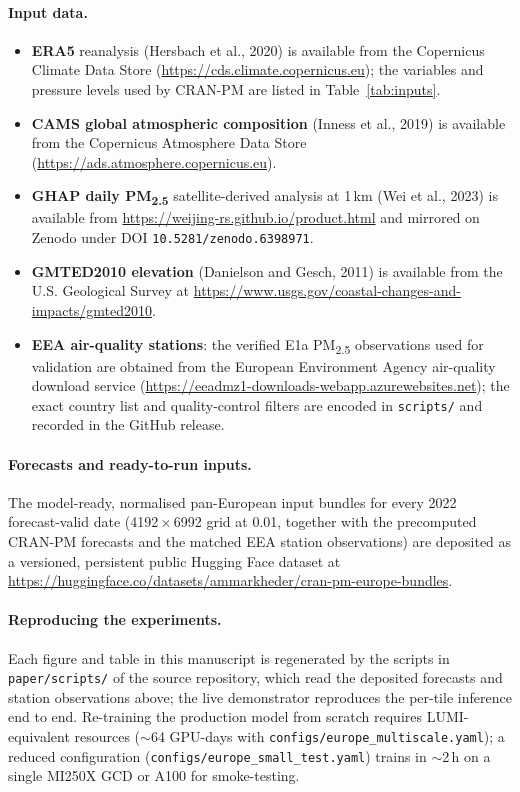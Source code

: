 \paragraph{Input data.}
\begin{itemize}
\item \textbf{ERA5} reanalysis (Hersbach et al., 2020) is available from
the Copernicus Climate Data Store
(\url{https://cds.climate.copernicus.eu}); the variables and pressure
levels used by CRAN-PM are listed in Table~\ref{tab:inputs}.

\item \textbf{CAMS global atmospheric composition} (Inness et al., 2019)
is available from the Copernicus Atmosphere Data Store
(\url{https://ads.atmosphere.copernicus.eu}).

\item \textbf{GHAP daily PM\textsubscript{2.5}} satellite-derived
analysis at 1\,km (Wei et al., 2023) is available from
\url{https://weijing-rs.github.io/product.html} and mirrored on Zenodo
under DOI \texttt{10.5281/zenodo.6398971}.

\item \textbf{GMTED2010 elevation} (Danielson and Gesch, 2011) is
available from the U.S. Geological Survey at
\url{https://www.usgs.gov/coastal-changes-and-impacts/gmted2010}.

\item \textbf{EEA air-quality stations}: the verified E1a
PM\textsubscript{2.5} observations used for validation are obtained
from the European Environment Agency air-quality download service
(\url{https://eeadmz1-downloads-webapp.azurewebsites.net}); the exact
country list and quality-control filters are encoded in
\texttt{scripts/} and recorded in the GitHub release.
\end{itemize}

\paragraph{Forecasts and ready-to-run inputs.}
The model-ready, normalised pan-European input bundles for every 2022
forecast-valid date (4192\,$\times$\,6992 grid at 0.01\textdegree,
together with the precomputed CRAN-PM forecasts and the matched EEA
station observations) are deposited as a versioned, persistent public
Hugging Face dataset at
\url{https://huggingface.co/datasets/ammarkheder/cran-pm-europe-bundles}.

\paragraph{Reproducing the experiments.}
Each figure and table in this manuscript is regenerated by the scripts
in \texttt{paper/scripts/} of the source repository, which read the
deposited forecasts and station observations above; the live
demonstrator reproduces the per-tile inference end to end. Re-training
the production model from scratch requires LUMI-equivalent resources
($\sim$64 GPU-days with \texttt{configs/europe\_multiscale.yaml}); a
reduced configuration (\texttt{configs/europe\_small\_test.yaml}) trains
in $\sim$2\,h on a single MI250X GCD or A100 for smoke-testing.
